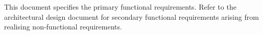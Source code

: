 This document specifies the primary functional requirements. Refer to the architectural design document for secondary functional requirements arising from realising non-functional requirements.
